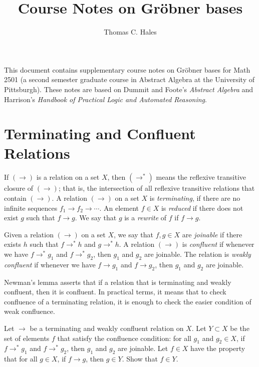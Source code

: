 \documentclass{llncs}
\def\op#1{{\hbox{#1}}}
\begin{document}
\title{Course Notes on Gr\"obner bases}
\author{Thomas C. Hales}
\maketitle

\def\ra{\rightarrow}
\def\ras{\rightarrow^*}
\def\LT{\op{LT}}

This document contains supplementary course notes on Gr\"obner bases for Math 2501 (a second semester graduate course in Abstract Algebra at the University of Pittsburgh).  These notes are based on Dummit and Foote's {\it Abstract Algebra} and Harrison's {\it Handbook of Practical Logic and Automated Reasoning}.


\section{Terminating and Confluent Relations}


If $(\ra)$ is a relation on a set $X$, then $(\ras)$ means the reflexive transitive closure of $(\ra)$; that is, the intersection of all reflexive transitive relations that contain $(\ra)$.  
A relation $(\ra)$ on a set $X$ is {\it terminating}, if there are no infinite sequences $f_1\ra f_2\ra \cdots$.
An element $f\in X$ is
{\it reduced} if there does not exist $g$ such that $f\ra g$.
We say that $g$ is a {\it rewrite} of $f$ if $f\ra g$.


Given a relation $(\ra)$ on a set $X$, we say that $f, g\in X$ are {\it joinable} if there exists $h$ such that $f\ras h$ and $g\ras h$.
A relation $(\ra)$ is {\it confluent} if whenever we have $f\ras g_1$ and $f\ras g_2$, then $g_1$ and $g_2$ are joinable.  The relation is {\it weakly confluent} if whenever we have
$f\ra g_1$ and $f\ra g_2$, then $g_1$ and $g_2$ are joinable.  

Newman's lemma asserts that if a relation that is terminating and weakly confluent, then it is confluent.  In practical terms, it means that to check confluence of a terminating relation, it is enough to check the easier condition of weak confluence.   

\begin{problem}\label{p1}  Let $\ra$ be a terminating and weakly confluent relation on $X$.
Let $Y\subset X$ be the set of elements $f$ that satisfy the confluence condition: for all $g_1$ and $g_2\in X$,
if $f\ras g_1$ and $f\ras g_2$, then $g_1$ and $g_2$ are joinable.  
Let   $f\in X$ have the property that for all $g\in X$, if $f\ra g$, then $g\in Y$.   
Show that $f\in Y$.
\end{problem}
\end{document}
